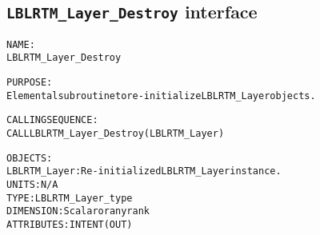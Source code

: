 \subsection{\texttt{LBLRTM\_Layer\_Destroy} interface}
  \label{sec:LBLRTM_Layer_Destroy_interface}
  \begin{alltt}
 
  NAME:
        LBLRTM_Layer_Destroy
 
  PURPOSE:
        Elemental subroutine to re-initialize LBLRTM_Layer objects.
 
  CALLING SEQUENCE:
        CALL LBLRTM_Layer_Destroy( LBLRTM_Layer )
 
  OBJECTS:
        LBLRTM_Layer: Re-initialized LBLRTM_Layer instance.
                      UNITS:      N/A
                      TYPE:       LBLRTM_Layer_type
                      DIMENSION:  Scalar or any rank
                      ATTRIBUTES: INTENT(OUT)
 
  \end{alltt}
